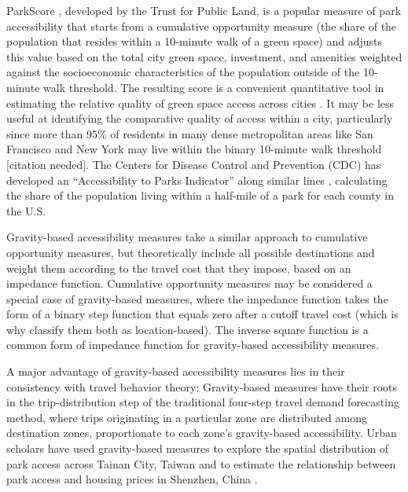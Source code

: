 \documentclass[3p, authoryear]{elsarticle} %
\begin{document}
ParkScore \citep{parkscore2019}, developed by the Trust for Public Land, is a popular
measure of park accessibility that starts from a cumulative opportunity measure
(the share of the population that resides within a 10-minute walk of a green
space) and adjusts this value based on the total city green space, investment,
and amenities weighted against the socioeconomic characteristics of the
population outside of the 10-minute walk threshold. The resulting score is a
convenient quantitative tool in estimating the relative quality of green space
access across cities \citep{Rigolon2018}. It may be less useful at identifying the
comparative quality of access within a city, particularly since more than 95\% of
residents in many dense metropolitan areas like San Francisco and New York may
live within the binary 10-minute walk threshold {[}citation needed{]}. The Centers
for Disease Control and Prevention (CDC) has developed an ``Accessibility to
Parks Indicator'' along similar lines \citep{Ussery2016}, calculating the share of the
population living within a half-mile of a park for each county in the U.S.

Gravity-based accessibility measures take a similar approach to cumulative
opportunity measures, but theoretically include all possible destinations and
weight them according to the travel cost that they impose, based on an impedance
function. Cumulative opportunity measures may be considered a special case of
gravity-based measures, where the impedance function takes the form of a binary
step function that equals zero after a cutoff travel cost (which is why
\citet{GEURS2004127} classify them both as location-based). The inverse square function
is a common form of impedance function for gravity-based accessibility measures.

A major advantage of gravity-based accessibility measures lies in their
consistency with travel behavior theory: Gravity-based measures have their roots
in the trip-distribution step of the traditional four-step travel demand
forecasting method, where trips originating in a particular zone are distributed
among destination zones, proportionate to each zone's gravity-based
accessibility. Urban scholars have used gravity-based measures to explore the
spatial distribution of park access across Tainan City, Taiwan
\citep{chang2011exploring} and to estimate the relationship between park access and
housing prices in Shenzhen, China \citep{wu2017spatial}.
\end{document}
